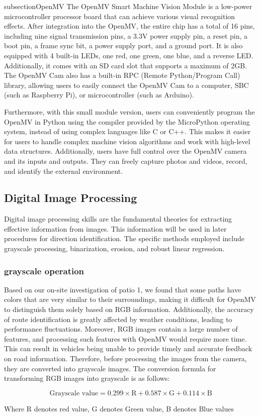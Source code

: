 \documentclass[12pt, a4paper, oneside]{report}
\begin{document}
subsection{OpenMV}
The OpenMV Smart Machine Vision Module is a low-power microcontroller processor board that can achieve various visual recognition effects. After integration into the OpenMV, the entire chip has a total of 16 pins, including nine signal transmission pins, a 3.3V power supply pin, a reset pin, a boot pin, a frame sync bit, a power supply port, and a ground port. It is also equipped with 4 built-in LEDs, one red, one green, one blue, and a reverse LED. Additionally, it comes with an SD card slot that supports a maximum of 2GB. The OpenMV Cam also has a built-in RPC (Remote Python/Program Call) library, allowing users to easily connect the OpenMV Cam to a computer, SBC (such as Raspberry Pi), or microcontroller (such as Arduino).
    
Furthermore, with this small module version, users can conveniently program the OpenMV in Python using the compiler provided by the MicroPython operating system, instead of using complex languages like C or C++. This makes it easier for users to handle complex machine vision algorithms and work with high-level data structures. Additionally, users have full control over the OpenMV camera and its inputs and outputs. They can freely capture photos and videos, record, and identify the external environment.
     
\subsection{Digital Image Processing}
Digital image processing skills are the fundamental theories for extracting effective information from images. This information will be used in later procedures for direction identification. The specific methods employed include grayscale processing, binarization, erosion, and robust linear regression.
    
\subsubsection*{grayscale operation}
Based on our on-site investigation of patio 1, we found that some paths have colors that are very similar to their surroundings, making it difficult for OpenMV to distinguish them solely based on RGB information. Additionally, the accuracy of route identification is greatly affected by weather conditions, leading to performance fluctuations. Moreover, RGB images contain a large number of features, and processing such features with OpenMV would require more time. This can result in vehicles being unable to provide timely and accurate feedback on road information. Therefore, before processing the images from the camera, they are converted into grayscale images.
The conversion formula for transforming RGB images into grayscale is as follows:
\begin{tcolorbox}
$$\text{Grayscale value} = 0.299 \times \text{R} + 0.587 \times \text{G} + 0.114 \times \text{B}$$
\end{tcolorbox}
Where R denotes red value, G denotes Green value, B denotes Blue values
\end{document}
